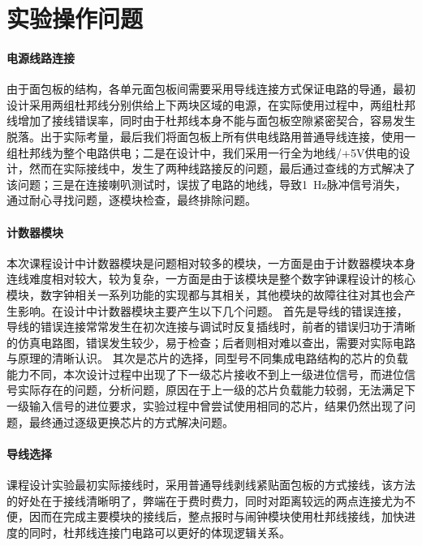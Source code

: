 \documentclass[lang=cn, 11pt, a4paper, cite=authornum, ctexfont]{paper}
\begin{document}


\section{实验操作问题}

\paragraph{电源线路连接}

由于面包板的结构，各单元面包板间需要采用导线连接方式保证电路的导通，最初设计采用两组杜邦线分别供给上下两块区域的电源，在实际使用过程中，两组杜邦线增加了接线错误率，同时由于杜邦线本身不能与面包板空隙紧密契合，容易发生脱落。出于实际考量，最后我们将面包板上所有供电线路用普通导线连接，使用一组杜邦线为整个电路供电；二是在设计中，我们采用一行全为地线/+5V供电的设计，然而在实际接线中，发生了两种线路接反的问题，最后通过查线的方式解决了该问题；三是在连接喇叭测试时，误拔了电路的地线，导致\SI{1}{\hertz}脉冲信号消失，通过耐心寻找问题，逐模块检查，最终排除问题。


\paragraph{计数器模块}
本次课程设计中计数器模块是问题相对较多的模块，一方面是由于计数器模块本身连线难度相对较大，较为复杂，一方面是由于该模块是整个数字钟课程设计的核心模块，数字钟相关一系列功能的实现都与其相关，其他模块的故障往往对其也会产生影响。在设计中计数器模块主要产生以下几个问题。
首先是导线的错误连接，导线的错误连接常常发生在初次连接与调试时反复插线时，前者的错误归功于清晰的仿真电路图，错误发生较少，易于检查；后者则相对难以查出，需要对实际电路与原理的清晰认识。
其次是芯片的选择，同型号不同集成电路结构的芯片的负载能力不同，本次设计过程中出现了下一级芯片接收不到上一级进位信号，而进位信号实际存在的问题，分析问题，原因在于上一级的芯片负载能力较弱，无法满足下一级输入信号的进位要求，实验过程中曾尝试使用相同的芯片，结果仍然出现了问题，最终通过逐级更换芯片的方式解决问题。

\paragraph{导线选择}

课程设计实验最初实际接线时，采用普通导线剥线紧贴面包板的方式接线，该方法的好处在于接线清晰明了，弊端在于费时费力，同时对距离较远的两点连接尤为不便，因而在完成主要模块的接线后，整点报时与闹钟模块使用杜邦线接线，加快进度的同时，杜邦线连接门电路可以更好的体现逻辑关系。
\end{document}

